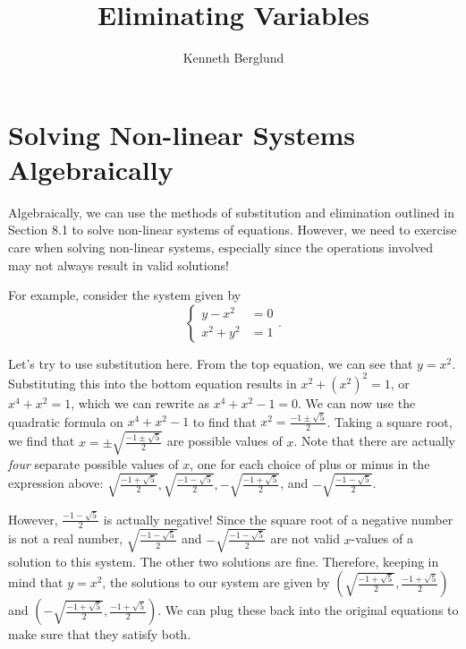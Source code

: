 \documentclass[nooutcomes]{ximera}
\author{Kenneth Berglund}
\title{Eliminating Variables}
\begin{document}
\begin{abstract}
  
\end{abstract}
\maketitle


\section{Solving Non-linear Systems Algebraically}
Algebraically, we can use the methods of substitution and elimination outlined in Section 8.1 to solve non-linear systems of equations. However, we need to exercise care when solving non-linear systems, especially since the operations involved may not always result in valid solutions! 

For example, consider the system given by 
$$
\begin{cases}
y - x^2 & = 0\\
x^2 + y^2 &= 1
\end{cases}.
$$

Let's try to use substitution here. From the top equation, we can see that $y = x^2$. Substituting this into the bottom equation results in $x^2 + (x^2)^2 = 1$, or $x^4 + x^2 = 1$, which we can rewrite as $x^4 + x^2 - 1 = 0$. We can now use the quadratic formula on $x^4 + x^2 - 1$ to find that $x^2 = \frac{-1 \pm \sqrt{5}}{2}$. Taking a square root, we find that $x = \pm \sqrt{\frac{-1 \pm \sqrt{5}}{2}}$ are possible values of $x$. Note that there are actually \emph{four} separate possible values of $x$, one for each choice of plus or minus in the expression above: $\sqrt{\frac{-1 + \sqrt{5}}{2}}, \sqrt{\frac{-1 - \sqrt{5}}{2}}, -\sqrt{\frac{-1 + \sqrt{5}}{2}}$, and $-\sqrt{\frac{-1 - \sqrt{5}}{2}}$. 

However, $\frac{-1 - \sqrt{5}}{2}$ is actually negative! Since the square root of a negative number is not a real number, $\sqrt{\frac{-1 - \sqrt{5}}{2}}$ and $-\sqrt{\frac{-1 - \sqrt{5}}{2}}$ are not valid $x$-values of a solution to this system. The other two solutions are fine. Therefore, keeping in mind that $y = x^2$, the solutions to our system are given by $\left(\sqrt{\frac{-1 + \sqrt{5}}{2}}, \frac{-1 + \sqrt{5}}{2}\right)$ and $\left(-\sqrt{\frac{-1 + \sqrt{5}}{2}}, \frac{-1 + \sqrt{5}}{2}\right)$. We can plug these back into the original equations to make sure that they satisfy both. 
\end{document}

